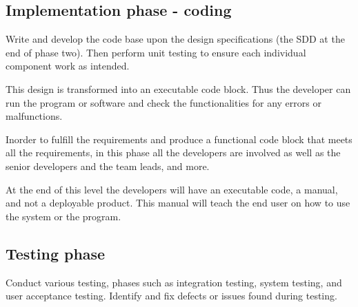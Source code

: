 \documentclass[a4paper]{article}
\begin{document}
\subsection{Implementation phase - coding}
 
Write and develop the code base upon the design specifications (the SDD at the end of phase two). Then perform unit testing to ensure each individual 
component work as intended. 
 
This design is transformed into an executable code block. Thus the developer can run the program or software and check the functionalities for any
errors or malfunctions.

Inorder to fulfill the requirements and produce a functional code block that meets all the requirements, in this phase all the developers are involved
as well as the senior developers and the team leads, and more.

At the end of this level the developers will have an executable code, a manual, and not a deployable product.  
This manual will teach the end user on how to use the system or the program. 


\subsection{Testing phase}

Conduct various testing, phases such as integration testing, system testing, and user acceptance testing. Identify and fix defects or issues found 
during testing.
\end{document}
